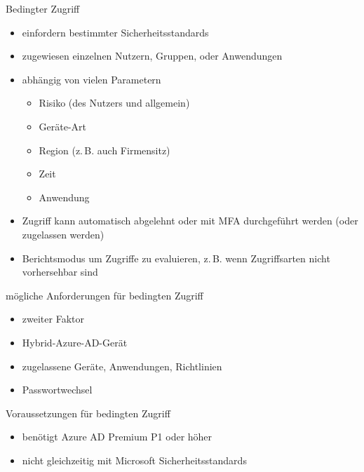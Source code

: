 \begin{flashcard}[Definition]{Bedingter Zugriff}
  \begin{itemize}
    \item einfordern bestimmter Sicherheitsstandards
    \item zugewiesen einzelnen Nutzern, Gruppen, oder Anwendungen
    \item abhängig von vielen Parametern
      \begin{itemize}
        \item Risiko (des Nutzers und allgemein)
        \item Geräte-Art
        \item Region (z.\,B. auch Firmensitz)
        \item Zeit
        \item Anwendung
      \end{itemize}
    \item Zugriff kann automatisch abgelehnt oder mit MFA durchgeführt werden\newline
      (oder zugelassen werden)
    \item Berichtsmodus um Zugriffe zu evaluieren, z.\,B. wenn Zugriffsarten nicht vorhersehbar sind
  \end{itemize}
\end{flashcard}

\begin{flashcard}[Definition]{mögliche Anforderungen für bedingten Zugriff}
  \begin{itemize}
    \item zweiter Faktor
    \item Hybrid-Azure-AD-Gerät
    \item zugelassene Geräte, Anwendungen, Richtlinien
    \item Passwortwechsel
  \end{itemize}
\end{flashcard}

\begin{flashcard}[Definition]{Voraussetzungen für bedingten Zugriff}
  \begin{itemize}
    \item benötigt Azure AD Premium P1 oder höher
    \item nicht gleichzeitig mit Microsoft Sicherheitsstandards
  \end{itemize}
\end{flashcard}


